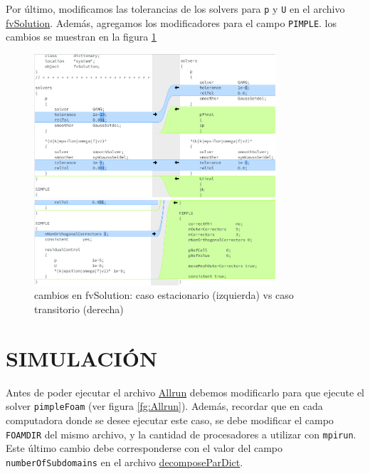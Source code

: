 \documentclass[oneside,a4paper,spanish,links]{amca}
\begin{document}
\newpage

Por último, modificamos las tolerancias de los solvers para \texttt{p} y \texttt{U} en el archivo \href{https://github.com/guillerolle/casos_cfd/tree/master/04/case/system/fvSolution}{fvSolution}. Además, agregamos los modificadores para el campo \texttt{PIMPLE}. los cambios se muestran en la figura \ref{fg:fvSolution}

\begin{figure}[htb]
	\centerline{\includegraphics[width=0.8\textwidth]{Figuras/02_fvSolution_1.png}} 
	\centerline{\includegraphics[width=0.8\textwidth]{Figuras/02_fvSolution_2.png}}
	\caption{cambios en fvSolution: caso estacionario (izquierda) vs caso transitorio (derecha)} \label{fg:fvSolution}
\end{figure}


\newpage
\section{SIMULACIÓN}
Antes de poder ejecutar el archivo \href{https://github.com/guillerolle/casos_cfd/tree/master/04/case/Allrun}{Allrun} debemos modificarlo para que ejecute el solver \texttt{pimpleFoam} (ver figura \ref{fg:Allrun}). Además, recordar que en cada computadora donde se desee ejecutar este caso, se debe modificar el campo \texttt{FOAMDIR} del mismo archivo, y la cantidad de procesadores a utilizar con \texttt{mpirun}. Este último cambio debe corresponderse con el valor del campo \texttt{numberOfSubdomains} en el archivo \href{https://github.com/guillerolle/casos_cfd/tree/master/04/case/system/decomposeParDict}{decomposeParDict}.
\end{document}
